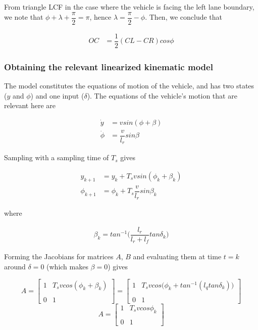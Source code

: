 From triangle LCF in the case where the vehicle is facing the left lane boundary,
we note that $\phi + \lambda + \dfrac{\pi}{2} = \pi$,
hence $\lambda = \dfrac{\pi}{2} - \phi$. Then, we conclude that

\begin{align}
  OC &= \dfrac{1}{2}(CL - CR) cos\phi
\end{align}




\subsubsection{Obtaining the relevant linearized kinematic model}

The model constitutes the equations of motion of the vehicle, and has two
states ($y$ and $\phi$) and one input ($\delta$). The equations of the
vehicle's motion that are relevant here are

\begin{align}
  \dot{y} &= v sin(\phi + \beta) \\
  \dot{\phi} &= \dfrac{v}{l_r} sin\beta
\end{align}

Sampling with a sampling time of $T_s$ gives

\begin{align}
  y_{k+1} &= y_{k} + T_s v sin(\phi_k + \beta_k) \\
  \phi_{k+1} &= \phi_{k} + T_s \dfrac{v}{l_r} sin\beta_k
\end{align}

where

\begin{align}
  \beta_k = tan^{-1}\Big(\dfrac{l_r}{l_r + l_f} tan\delta_k\Big)
\end{align}


Forming the Jacobians for matrices $A$, $B$ and evaluating them at time
$t=k$ around $\delta = 0$ (which makes $\beta = 0$) gives

\begin{equation}
 A =
  \begin{bmatrix}
    1 & T_s v cos(\phi_k + \beta_k) \\\\
    0 & 1
  \end{bmatrix}
  =
  \begin{bmatrix}
    1 & T_s v cos\Big(\phi_k + tan^{-1} (l_q tan\delta_k)\Big) \\\\
    0 & 1
  \end{bmatrix}
\end{equation}
\begin{equation}
 A =
  \begin{bmatrix}
    1 & T_s v cos\phi_k \\\\
    0 & 1
  \end{bmatrix}
\end{equation}


